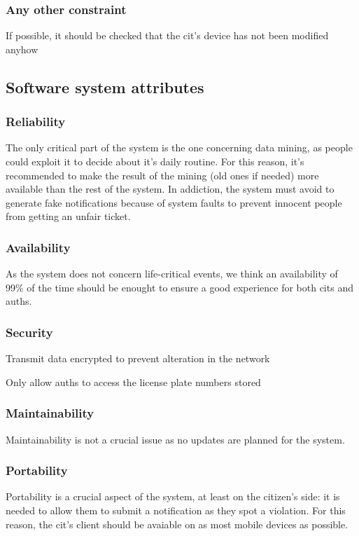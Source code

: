 \documentclass{article}
\begin{document}
		\subsubsection{Any other constraint} If possible, it should be checked that the cit's device has not been modified anyhow
		
	\subsection{Software system attributes}
	
		\subsubsection{Reliability}
			The only critical part of the system is the one concerning data mining, as people could exploit it to decide about it's daily routine. For this reason, it's recommended to make the result of the mining (old ones if needed) more available than the rest of the system.
			In addiction, the system must avoid to generate fake notifications because of system faults to prevent innocent people from getting an unfair ticket.
			
		\subsubsection{Availability}
			As the system does not concern life-critical events, we think an availability of 99\% of the time should be enought to ensure a good experience for both cits and auths.
			
		\subsubsection{Security}
			\begin{list}{-}{}
				\item Transmit data encrypted to prevent alteration in the network
				\item Only allow auths to access the license plate numbers stored
			\end{list}
			
		\subsubsection{Maintainability}
			Maintainability is not a crucial issue as no updates are planned for the system.
			
		\subsubsection{Portability}
			Portability is a crucial aspect of the system, at least on the citizen's side: it is needed to allow them to submit a notification as they spot a violation. For this reason, the cit's client should be avaiable on as most mobile devices as possible.
\end{document}
